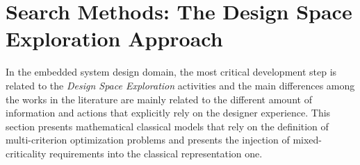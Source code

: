 \chapter{Search Methods: The Design Space Exploration Approach} \label{dse_chapter_ref}
%
In the embedded system design domain, the most critical development step is related to the \textit{Design Space Exploration} activities \cite{bib10} and the main differences among the works in the literature are mainly related to the different amount of information and actions that explicitly rely on the designer experience. This section presents mathematical classical models that rely on the definition of multi-criterion optimization problems and presents the injection of mixed-criticality requirements into the classical representation one. 
%
